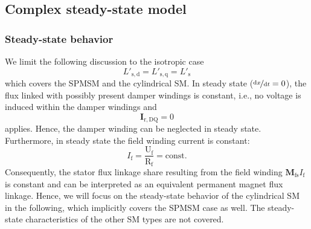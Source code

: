 \subsection{Complex steady-state model}

\begin{frame}
	\frametitle{Steady-state behavior}
	We limit the following discussion to the isotropic case
	$$L'_\mathrm{s,d} =  L'_\mathrm{s,q} =L'_\mathrm{s}$$
	which covers the SPMSM and the cylindrical SM. \pause In steady state ($\nicefrac{\mathrm{d}x}{\mathrm{d}t} = 0$), the flux linked with possibly present damper windings is constant, i.e., no voltage is induced within the damper windings and 
	$$\bm{I}_\mathrm{r,DQ} = 0$$ 
	applies. \pause Hence, the damper winding can be neglected in steady state. \pause Furthermore, in steady state the field winding current is constant: 
	$$I_\mathrm{f} = \frac{\mathrm{U}_\mathrm{f} }{\mathrm{R}_\mathrm{f}} = \mathrm{const.}$$
	\pause
	Consequently, the stator flux linkage share resulting from the field winding $\bm{M}_\mathrm{fs} I_{\mathrm{f}}$ is constant and can be interpreted as an equivalent permanent magnet flux linkage. Hence, we will focus on the steady-state behavior of the cylindrical SM in the following, which implicitly covers the SPMSM case as well. The steady-state characteristics of the other SM types are not covered.
\end{frame}


